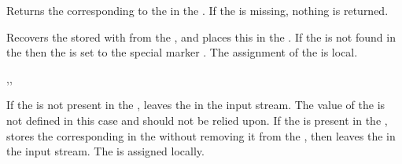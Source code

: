 \documentclass[oneside]{book}
\let\tn=\cs
\begin{document}
\begin{function}{\PropVarItem}
\begin{syntax}
  
\end{syntax}
Returns the  corresponding to the  in
the . If the  is missing,
nothing is returned.
\begin{demohigh}
\PropSetFromKeyval {}
\TlSet {}
\TlUse \lTmpaTl
\end{demohigh}
\end{function}

\begin{function}{\PropGet}
\begin{syntax}
   
\end{syntax}
Recovers the  stored with  from the ,
and places this in the .
If the  is not found in the
 then the  is set
to the special marker .
The assignment of the  is local.
\begin{demohigh}
\PropSetFromKeyval {}
\PropGet {} \lTmpaTl
\TlUse \lTmpaTl
\end{demohigh}
\end{function}

\begin{function}{\PropGetT,\PropGetF,\PropGetTF}
\begin{syntax}
    
    
     
\end{syntax}
If the  is not present in the , leaves
the  in the input stream.  The value of the
 is not defined in this case and should
not be relied upon.  If the  is present in the
, stores the corresponding  in the
 without removing it from the
, then leaves the  in the input
stream.  The  is assigned locally.
\begin{demohigh}
\PropSetFromKeyval {}
\PropGetTF {}  {}
\end{demohigh}
\end{function}
\end{document}
